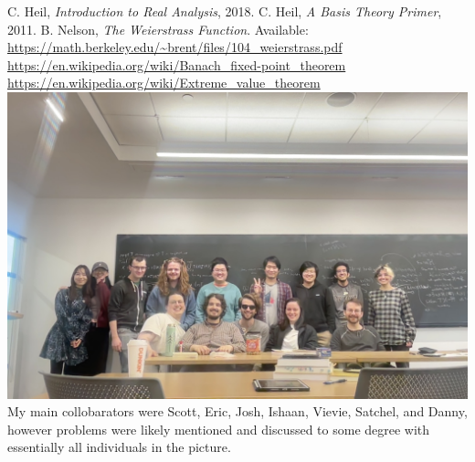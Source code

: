 \documentclass[12pt]{article}
\begin{document}
\begin{thebibliography}{9}
    C. Heil, \textit{Introduction to Real Analysis}, 2018.
    C. Heil, \textit{A Basis Theory Primer}, 2011.
    B. Nelson, \textit{The Weierstrass Function}. Available: \url{https://math.berkeley.edu/~brent/files/104_weierstrass.pdf}
    \url{https://en.wikipedia.org/wiki/Banach_fixed-point_theorem}
    \url{https://en.wikipedia.org/wiki/Extreme_value_theorem}
    \includegraphics[width=150mm]{FuNtional exam group.jpg}
    My main collobarators were Scott, Eric, Josh, Ishaan, Vievie, Satchel, and Danny, however problems were likely mentioned and discussed to some degree with essentially all individuals in the picture.
\end{thebibliography}
\end{document}
